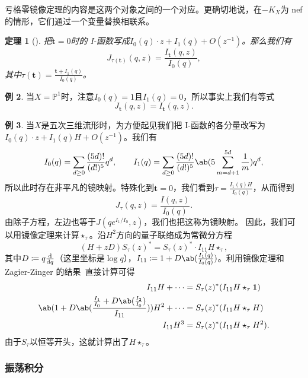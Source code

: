 \documentclass{amsart}
\newtheorem{thm}{定理}[section]
\theoremstyle{definition}
\newtheorem{exm}[thm]{例}
\theoremstyle{remark}
\theoremstyle{plain}
\theoremstyle{definition}
\theoremstyle{remark}
\renewcommand{\P}{\mathbb{P}}
\newcommand{\mbf}[1]{\mathbf{#1}}
\newcommand{\1}{\mathbf{1}}
\newcommand{\2}{\mathbf{2}}
\newcommand{\3}{\mathbf{3}}
\begin{document}
亏格零镜像定理的内容是这两个对象之间的一个对应。更确切地说，在\(-K_X\)为 nef 的情形，它们通过一个变量替换相联系。

\begin{thm}[{\cite{Givental1998,LLY1997}}]
    把\(\mbf{t} = 0\)时的 I-函数写成\(I_0(q) \cdot z + I_1(q) + O(z^{-1})\)。那么我们有
    \[
        J_{\tau(\mbf{t})}(q,z) = \frac{I_{\mbf{t}}(q,z)}{I_0(q)},
    \]
    其中\(\tau(\mbf{t}) = \frac{\mbf{t} + I_1(q)}{I_0(q)}\)。
\end{thm}

\begin{exm}
    当\(X = \P^1\)时，注意\(I_0(q) = 1\)且\(I_1(q) = 0\)，所以事实上我们有等式
    \[ J_{\mbf{t}}(q,z) = I_{\mbf{t}}(q,z). \]
\end{exm}

\begin{exm}
    当\(X\)是五次三维流形时，为方便起见我们把 I-函数的各分量改写为\(I_0(q) \cdot z + I_1(q)H + O(z^{-1})\)。我们有
    \[ I_0(q) = \sum_{d \geq 0} \frac{(5d)!}{(d!)^5} q^d, \qquad I_1(q) = \sum_{d \geq 0} \frac{(5d)!}{(d!)^5} \ab(5\sum_{m=d+1}^{5d} \frac{1}{m}) q^d, \]
    所以此时存在非平凡的镜映射。特殊化到\(\mbf{t} = 0\)，我们看到\(\tau = \frac{I_1(q)H}{I_0(q)}\)，从而得到
    \[ J_{\tau}(q,z) = \frac{I(q,z)}{I_0(q)}. \]
    由除子方程，左边也等于\(J(qe^{I_1/I_0}, z)\)，我们也把这称为镜映射。
    因此，我们可以用镜像定理来计算$\star_{\tau}$。沿\(H^2\)方向的量子联络成为常微分方程
    \[ (H+zD) S_{\tau}(z)^* = S_{\tau}(z)^* \cdot I_{11} H \star_{\tau}, \]
    其中$D \coloneqq q \odv{}{q}$（这里坐标是$\log q$），$I_{11} \coloneqq 1 + D \ab(\frac{I_1(q)}{I_0(q)})$。利用镜像定理和 Zagier-Zinger 的结果~\cite{ZagierZinger2008}直接计算可得
    \begin{align*}
        I_{11} H + \cdots &= S_{\tau}(z)^* (I_{11} H \star_{\tau} \1) \\
        \ab( 1 + D\ab(\frac{\frac{I_1}{I_0} + D \ab(\frac{I_2}{I_0})}{I_{11}}) ) H^2 + \cdots &= S_{\tau}(z)^* (I_{11} H \star_{\tau} H) \\
        I_{11} H^3 &= S_{\tau}(z)^* (I_{11}H \star_{\tau} H^2).
    \end{align*}
    由于$S_{\tau}$以恒等开头，这就计算出了$H \star_{\tau}$。
\end{exm}

\subsubsection{振荡积分}%
\label{ssub:Oscillating integrals}
\end{document}
